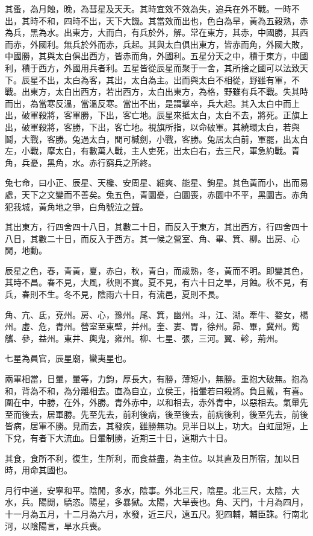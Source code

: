 其蚤，為月蝕，晚，為彗星及天夭。其時宜效不效為失，追兵在外不戰。一時不出，其時不和，四時不出，天下大饑。其當效而出也，色白為旱，黃為五穀熟，赤為兵，黑為水。出東方，大而白，有兵於外，解。常在東方，其赤，中國勝，其西而赤，外國利。無兵於外而赤，兵起。其與太白俱出東方，皆赤而角，外國大敗，中國勝，其與太白俱出西方，皆赤而角，外國利。五星分天之中，積于東方，中國利，積于西方，外國用兵者利。五星皆從辰星而聚于一舍，其所捨之國可以法致天下。辰星不出，太白為客，其出，太白為主。出而與太白不相從，野雖有軍，不戰。出東方，太白出西方，若出西方，太白出東方，為格，野雖有兵不戰。失其時而出，為當寒反溫，當溫反寒。當出不出，是謂擊卒，兵大起。其入太白中而上出，破軍殺將，客軍勝，下出，客亡地。辰星來抵太白，太白不去，將死。正旗上出，破軍殺將，客勝，下出，客亡地。視旗所指，以命破軍。其繞環太白，若與鬬，大戰，客勝。兔過太白，閒可椷劍，小戰，客勝。兔居太白前，軍罷，出太白左，小戰，摩太白，有數萬人戰，主人吏死，出太白右，去三尺，軍急約戰。青角，兵憂，黑角，水。赤行窮兵之所終。

兔七命，曰小正、辰星、天欃、安周星、細爽、能星、鉤星。其色黃而小，出而易處，天下之文變而不善矣。兔五色，青圜憂，白圜喪，赤圜中不平，黑圜吉。赤角犯我城，黃角地之爭，白角號泣之聲。

其出東方，行四舍四十八日，其數二十日，而反入于東方，其出西方，行四舍四十八日，其數二十日，而反入于西方。其一候之營室、角、畢、箕、柳。出房、心閒，地動。

辰星之色，春，青黃，夏，赤白，秋，青白，而歲熟，冬，黃而不明。即變其色，其時不昌。春不見，大風，秋則不實。夏不見，有六十日之旱，月蝕。秋不見，有兵，春則不生。冬不見，陰雨六十日，有流邑，夏則不長。

角、亢、氐，兗州。房、心，豫州。尾、箕，幽州。斗，江、湖。牽牛、婺女，楊州。虛、危，青州。營室至東壁，并州。奎、婁、胃，徐州。昴、畢，冀州。觜觿、參，益州。東井、輿鬼，雍州。柳、七星、張，三河。翼、軫，荊州。

七星為員官，辰星廟，蠻夷星也。

兩軍相當，日暈，暈等，力鈞，厚長大，有勝，薄短小，無勝。重抱大破無。抱為和，背為不和，為分離相去。直為自立，立侯王，指暈若曰殺將。負且戴，有喜。圍在中，中勝，在外，外勝。青外赤中，以和相去，赤外青中，以惡相去。氣暈先至而後去，居軍勝。先至先去，前利後病，後至後去，前病後利，後至先去，前後皆病，居軍不勝。見而去，其發疾，雖勝無功。見半日以上，功大。白虹屈短，上下兌，有者下大流血。日暈制勝，近期三十日，遠期六十日。

其食，食所不利，復生，生所利，而食益盡，為主位。以其直及日所宿，加以日時，用命其國也。

月行中道，安寧和平。陰閒，多水，陰事。外北三尺，陰星。北三尺，太陰，大水，兵。陽閒，驕恣。陽星，多暴獄。太陽，大旱喪也。角、天門，十月為四月，十一月為五月，十二月為六月，水發，近三尺，遠五尺。犯四輔，輔臣誅。行南北河，以陰陽言，旱水兵喪。

